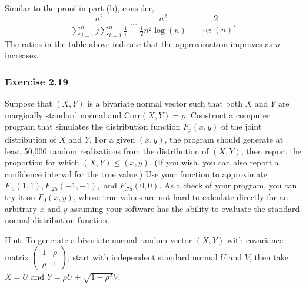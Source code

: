 \documentclass[12pt,]{article}
\begin{document}
Similar to the proof in part (b), consider,
\[\frac{n^2}{\sum_{j=1}^nj \sum_{i=1}^n\frac{1}{i}}\sim\frac{n^2}{\frac{1}{2}n^2\log(n)} =\frac{2}{\log(n)}.\]
The ratios in the table above indicate that the approximation improves
as \(n\) increases.

\vspace{40pt}

\hypertarget{exercise-2.19}{%
\subsubsection{Exercise 2.19}\label{exercise-2.19}}

Suppose that \((X, Y)\) is a bivariate normal vector such that both
\(X\) and \(Y\) are marginally standard normal and Corr\((X,Y) = \rho\).
Construct a computer program that simulates the distribution function
\(F_\rho(x,y)\) of the joint distribution of \(X\) and \(Y\). For a
given \((x,y)\), the program should generate at least 50,000 random
realizations from the distribution of \((X,Y)\), then report the
proportion for which \((X,Y) \le (x,y)\). (If you wish, you can also
report a confidence interval for the true value.) Use your function to
approximate \(F_{.5}(1,1), F_{.25}(-1,-1),\) and \(F_{.75}(0,0)\). As a
check of your program, you can try it on \(F_0(x,y)\), whose true values
are not hard to calculate directly for an arbitrary \(x\) and \(y\)
assuming your software has the ability to evaluate the standard normal
distribution function.

Hint: To generate a bivariate normal random vector \((X,Y)\) with
covariance matrix
\(\begin{pmatrix} 1 & \rho \\ \rho & 1 \end{pmatrix}\), start with
independent standard normal \(U\) and \(V\), then take \(X = U\) and
\(Y = \rho U + \sqrt{1-\rho^2}V.\)
\end{document}
